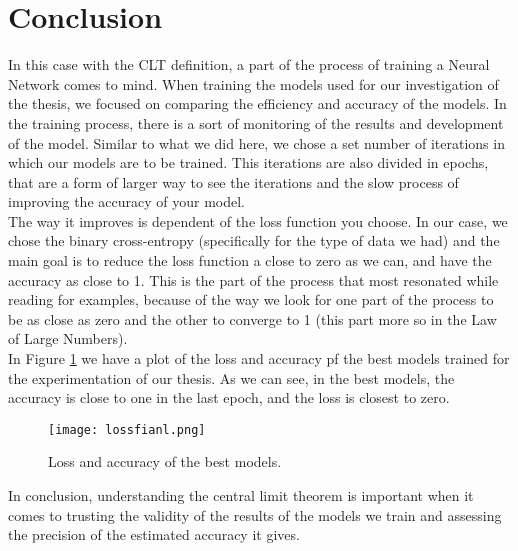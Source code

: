 \documentclass{article}
\begin{document}
\section{Conclusion}

In this case with the CLT definition, a part of the process of training a Neural Network comes to mind. When training the models used for our investigation of the thesis, we focused on comparing the efficiency and accuracy of the models. In the training process, there is a sort of monitoring of the results and development of the model. Similar to what we did here, we chose a set number of iterations in which our models are to be trained. This iterations are also divided in epochs, that are a form of larger way to see the iterations and the slow process of improving the accuracy of your model.\\

The way it improves is dependent of the loss function you choose. In our case, we chose the binary cross-entropy (specifically for the type of data we had) and the main goal is to reduce the loss function a close to zero as we can, and have the accuracy as close to 1. This is the part of the process that most resonated while reading for examples, because of the way we look for one part of the process to be as close as zero and the other to converge to 1 (this part more so in the Law of Large Numbers).\\

In Figure \ref{final} we have a plot of the loss and accuracy pf the best models trained for the experimentation of our thesis. As we can see, in the best models, the accuracy is close to one in the last epoch, and the loss is closest to zero.\\

\begin{figure}[]
\centering
  \texttt{[image: lossfianl.png]} 
   \caption{Loss and accuracy of the best models.} 
\label{final}
\end{figure}



In conclusion, understanding the central limit theorem is important when it comes to trusting the validity of the results of the models we train and assessing the precision of the estimated accuracy it gives. \\





 
\end{document}
